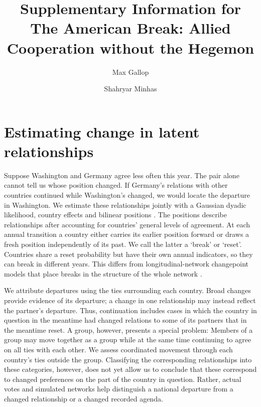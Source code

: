 \documentclass[10pt,authoryear]{elsarticle}
\begin{document}
\thispagestyle{empty}
\begin{frontmatter}

\title{Supplementary Information for\\The American Break: Allied Cooperation without the Hegemon}
\author[strath]{Max Gallop}
\author[msu]{Shahryar Minhas}
\address[strath]{Department of Government and Public Policy, University of Strathclyde}
\address[msu]{Department of Political Science, Michigan State University}
\end{frontmatter}

\setcounter{page}{1}
\appendix
\section{Estimating change in latent relationships}
\label{app:model}

Suppose Washington and Germany agree less often this year. The pair alone cannot tell us whose position changed. If Germany's relations with other countries continued while Washington's changed, we would locate the departure in Washington. We estimate these relationships jointly with a Gaussian dyadic likelihood, country effects and bilinear positions \citep{hoff:2021, minhas:etal:2019, gallop:minhas2021, sewell:chen:2015, park:sohn:2020}. The positions describe relationships after accounting for countries' general levels of agreement. At each annual transition a country either carries its earlier position forward or draws a fresh position independently of its past. We call the latter a `break' or `reset'. Countries share a reset probability but have their own annual indicators, so they can break in different years. This differs from longitudinal-network changepoint models that place breaks in the structure of the whole network \citep{park:sohn:2020}.

We attribute departures using the ties surrounding each country. Broad changes provide evidence of its departure; a change in one relationship may instead reflect the partner’s departure. Thus, continuation includes cases in which the country in question in the meantime had changed relations to some of its partners that in the meantime reset. A group, however, presents a special problem: Members of a group may move together as a group while at the same time continuing to agree on all ties with each other. We assess coordinated movement through each country’s ties outside the group. Classifying the corresponding relationships into these categories, however, does not yet allow us to conclude that these correspond to changed preferences on the part of the country in question. Rather, actual votes and simulated networks help distinguish a national departure from a changed relationship or a changed recorded agenda.
\end{document}
